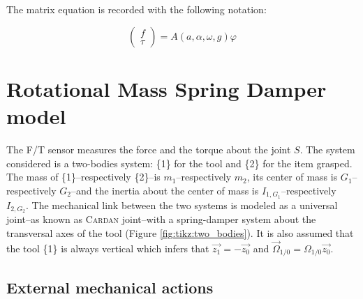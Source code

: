 \documentclass[\main/main.tex]{subfiles}
\begin{document}
The matrix equation is recorded with the following notation:

\begin{equation}
  \label{appendix:rigid:matrix}
 \begin{pmatrix}
  f    \\
  \tau
 \end{pmatrix}
 = A(a, \alpha, \omega, g) \varphi
\end{equation}

\newpage

\section{Rotational Mass Spring Damper model}
\label{appendix:rmsd}

The F/T sensor measures the force and the torque about the joint $S$.
The system considered is a two-bodies system: \{1\} for the tool and \{2\} for the item grasped. The mass of \{1\}–respectively \{2\}–is $m_1$–respectively $m_2$, its center of mass is $G_1$–respectively $G_2$–and the inertia about the center of mass is $I_{1, G_1}$–respectively $I_{2, G_2}$. The mechanical link between the two systems is modeled as a universal joint–as known as \textsc{Cardan} joint–with a spring-damper system about the transversal axes of the tool (Figure \ref{fig:tikz:two_bodies}). It is also assumed that the tool \{1\} is always vertical which infers that $\overrightarrow{z_1} = -\overrightarrow{z_0}$ and $\overrightarrow{\Omega}_{1/0} = \Omega_{1/0} \overrightarrow{z_0}$.

\subsection{External mechanical actions}
\end{document}
